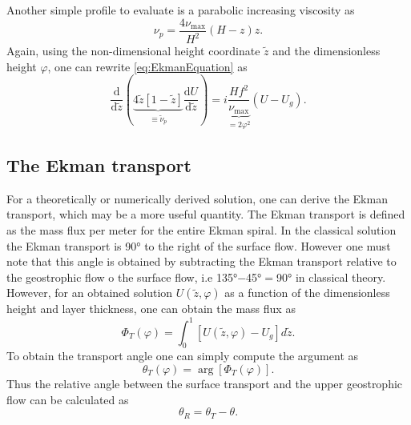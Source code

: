 Another simple profile to evaluate is a parabolic increasing viscosity as 
\begin{equation}
    \nu_p=\frac{4\nu_\text{max}}{H^2}\left(H-z\right)z.
    \label{eq:ParabolicProfile}
\end{equation} 
Again, using the non-dimensional height coordinate $\tilde z$ and the dimensionless height $\varphi$, one can rewrite \autoref{eq:EkmanEquation} as 
\begin{equation}
    \frac{\mathrm{d}}{\mathrm{d} \tilde z}\left(\underbrace{4\tilde z\left[1-\tilde z \right]}_{\equiv\tilde\nu_p}\frac{\mathrm{d} U}{\mathrm{d} \tilde z}\right)=i\underbrace{\frac{Hf^2}{\nu_\text{max}}}_{=2\varphi^2}(U-U_g).
\end{equation}


\subsection{The Ekman transport}
For a theoretically or numerically derived solution, one can derive the Ekman transport, which may be a more useful quantity. The Ekman transport is defined as the mass flux per meter for the entire Ekman spiral. In the classical solution the Ekman transport is \ang{90} to the right of the surface flow. However one must note that this angle is obtained by subtracting the Ekman transport relative to the geostrophic flow o the surface flow, i.e \ang{135}$-$\ang{45}$=$\ang{90} in classical theory. However, for an obtained solution $U(\tilde z, \varphi)$ as a function of the dimensionless height and layer thickness, one can obtain the mass flux as 
\begin{equation}
    \Phi_T(\varphi) = \int_0^1\left[U(\tilde z,\varphi)-U_g\right]d\tilde z. 
\end{equation}
To obtain the transport angle one can simply compute the argument as 
\begin{equation}
    \theta_T(\varphi) = \arg\left[\Phi_T(\varphi)\right].
\end{equation}
Thus the relative angle between the surface transport and the upper geostrophic flow can be calculated as 
\begin{equation}
    \theta_R = \theta_T - \theta.
\end{equation}